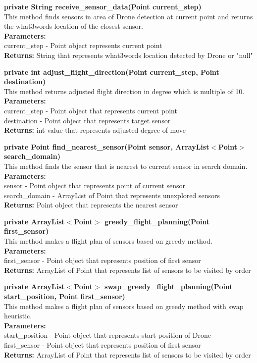 \documentclass[12pt]{article}
\begin{document}
\textbf{private String receive\_sensor\_data(Point current\_step)}\\
This method finds sensors in area of Drone detection at current point and returns the what3words location of the closest sensor.\\
\textbf{Parameters:} \\
current\_step - Point object represents current point\\
\textbf{Returns:} String that represents what3words location detected by Drone or "null"

\textbf{private int adjust\_flight\_direction(Point current\_step, Point destination)}\\
This method returns adjusted flight direction in degree which is multiple of 10.\\
\textbf{Parameters:} \\
current\_step - Point object that represents current point\\
destination - Point object that represents target sensor\\
\textbf{Returns:} int value that represents adjusted degree of move

\textbf{private Point find\_nearest\_sensor(Point sensor, ArrayList$<$Point$>$ search\_domain)}\\
This method finds the sensor that is nearest to current sensor in search domain.\\
\textbf{Parameters:} \\
sensor - Point object that represents point of current sensor\\
search\_domain - ArrayList of Point that represents unexplored sensors\\
\textbf{Returns:} Point object that represents the nearest sensor

\textbf{private ArrayList$<$Point$>$ greedy\_flight\_planning(Point first\_sensor)}\\
This method makes a flight plan of sensors based on greedy method.\\
\textbf{Parameters:} \\
first\_sensor - Point object that represents position of first sensor\\
\textbf{Returns:} ArrayList of Point that represents list of sensors to be visited by order

\textbf{private ArrayList$<$Point$>$ swap\_greedy\_flight\_planning(Point start\_position, Point first\_sensor)}\\
This method makes a flight plan of sensors based on greedy method with swap heuristic.\\
\textbf{Parameters:} \\
start\_position - Point object that represents start position of Drone\\
first\_sensor - Point object that represents position of first sensor\\
\textbf{Returns:} ArrayList of Point that represents list of sensors to be visited by order
\end{document}
